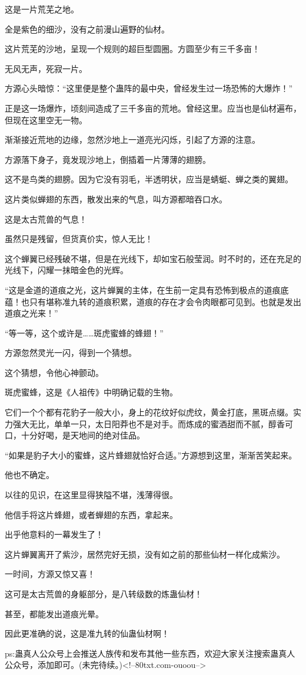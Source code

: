 \begin{this_body}
这是一片荒芜之地。

全是紫色的细沙，没有之前漫山遍野的仙材。

这片荒芜的沙地，呈现一个规则的超巨型圆圈。方圆至少有三千多亩！

无风无声，死寂一片。

方源心头暗惊：“这里便是整个蛊阵的最中央，曾经发生过一场恐怖的大爆炸！”

正是这一场爆炸，顷刻间造成了三千多亩的荒地。曾经这里。应当也是仙材遍布，但现在这里空无一物。

渐渐接近荒地的边缘，忽然沙地上一道亮光闪烁，引起了方源的注意。

方源落下身子，竟发现沙地上，倒插着一片薄薄的翅膀。

这不是鸟类的翅膀。因为它没有羽毛，半透明状，应当是蜻蜓、蝉之类的翼翅。

这片类似蝉翅的东西，散发出来的气息，叫方源都暗吞口水。

这是太古荒兽的气息！

虽然只是残留，但货真价实，惊人无比！

这个蝉翼已经残破不堪，但是在光线下，却如宝石般莹润。时不时的，还在充足的光线下，闪耀一抹暗金色的光辉。

“这是金道的道痕之光，这片蝉翼的主体，在生前一定具有恐怖到极点的道痕底蕴！也只有堪称准九转的道痕积累，道痕的存在才会令肉眼都可见到。也就是发出道痕之光来！”

“等一等，这个或许是……斑虎蜜蜂的蜂翅！”

方源忽然灵光一闪，得到一个猜想。

这个猜想，令他心神颤动。

斑虎蜜蜂，这是《人祖传》中明确记载的生物。

它们一个个都有花豹子一般大小，身上的花纹好似虎纹，黄金打底，黑斑点缀。实力强大无比，单单一只，太日阳莽也不是对手。而炼成的蜜酒甜而不腻，醇香可口，十分好喝，是天地间的绝对佳品。

“如果是豹子大小的蜜蜂，这片蜂翅就恰好合适。”方源想到这里，渐渐苦笑起来。

他也不确定。

以往的见识，在这里显得狭隘不堪，浅薄得很。

他信手将这片蜂翅，或者蝉翅的东西，拿起来。

出乎他意料的一幕发生了！

这片蝉翼离开了紫沙，居然完好无损，没有如之前的那些仙材一样化成紫沙。

一时间，方源又惊又喜！

这可是太古荒兽的身躯部分，是八转级数的炼蛊仙材！

甚至，都能发出道痕光晕。

因此更准确的说，这是准九转的仙蛊仙材啊！

ps:蛊真人公众号上会推送人族传和发布其他一些东西，欢迎大家关注搜索蛊真人公众号，添加即可。(未完待续。)<!--80txt.com-ouoou-->

\end{this_body}

